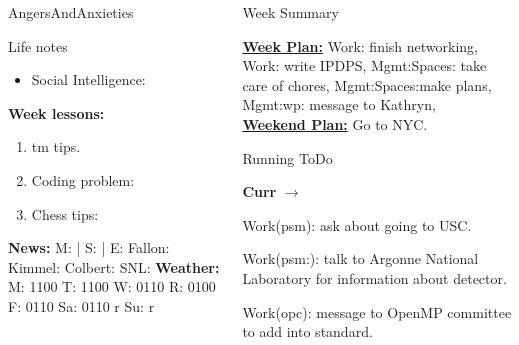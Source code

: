 \begin{columns}
\begin{column}{0.20\linewidth}
\begin{block}{AngersAndAnxieties}
\begin{itemize}
      \end{itemize}
    \end{block}
      \begin{block}{Life notes}
        \begin{itemize}
          \tiny \item \tiny Social Intelligence: 
        \end{itemize}
      \end{block}
      \begin{block}
        {\tiny {\bf Week lessons:}}
        \begin{enumerate}
        \item \tiny tm tips.
        \item \tiny Coding problem: 
        \item \tiny Chess tips: 
        \end{enumerate}
            {{\tiny {\tiny \bf  News:}} {\tiny  M:  | S: 
                | E: Fallon:  Kimmel:  Colbert: SNL:}}
            {{\tiny {\tiny \bf  Weather:}} {\tiny M: 1100 T: 1100 W:
                0110 R: 0100 F: 0110 Sa: 0110 r Su: r }} 

             
      \end{block}
  \end{column}
  \begin{column}{0.6\linewidth}
    \begin{block}{Week Summary}

      {\underline {\bf Week Plan:} Work: finish networking, Work:
        write IPDPS, Mgmt:Spaces: take care of chores,
        Mgmt:Spaces:make plans, 
        Mgmt:wp: message to Kathryn,
      } \\
      {\underline{\bf Weekend Plan:} Go to NYC. } \\
    \end{block}
    \begin{block}{Running ToDo} %


    \item \tiny \textbf{Curr} $\rightarrow$  

    \item \tiny Work(psm): ask about going to USC. 
    \item \tiny Work(psm:): talk to Argonne National Laboratory for
      information about detector. 
    \item \tiny Work(opc): message to OpenMP committee to add into
      standard. 


\end{block}
\end{column}
\end{columns}
